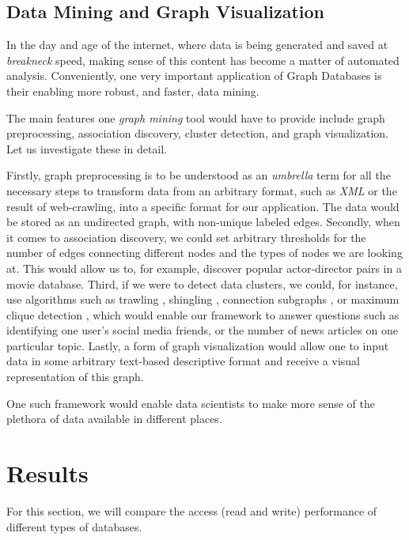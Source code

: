 \documentclass[10pt,        %
               a4paper,     %
               journal,     %
               ]{IEEEtran}
\begin{document}
\subsection{Data Mining and Graph Visualization}
In the day and age of the internet, where data is being generated and saved at \textit{breakneck} speed, making sense of this content has become a matter of automated analysis. Conveniently, one very important application of Graph Databases is their enabling more robust, and faster, data mining. \par
The main features one \textit{graph mining} tool would have to provide include graph preprocessing, association discovery, cluster detection, and graph visualization. Let us investigate these in detail. \par
Firstly, graph preprocessing is to be understood as an \textit{umbrella} term for all the necessary steps to transform data from an arbitrary format, such as \textit{XML} or the result of web-crawling, into a specific format for our application. The data would be stored as an undirected graph, with non-unique labeled edges. \cite{IEEEpaper2:mining} Secondly, when it comes to association discovery, we could set arbitrary thresholds for the number of edges connecting different nodes and the types of nodes we are looking at. This would allow us to, for example, discover popular actor-director pairs in a movie database. Third, if we were to detect data clusters, we could, for instance, use algorithms such as trawling \cite{paper_2_ref_1}, shingling \cite{paper_2_ref_2}, connection subgraphs \cite{paper_2_ref_3}, or maximum clique detection \cite{paper_2_ref_4}, which would enable our framework to answer questions such as identifying one user's social media friends, or the number of news articles on one particular topic. Lastly, a form of graph visualization would allow one to input data in some arbitrary text-based descriptive format and receive a visual representation of this graph. \par
One such framework would enable data scientists to make more sense of the plethora of data available in different places. 

\section{Results} 
For this section, we will compare the access (read and write) performance of different types of databases. 
\end{document}
